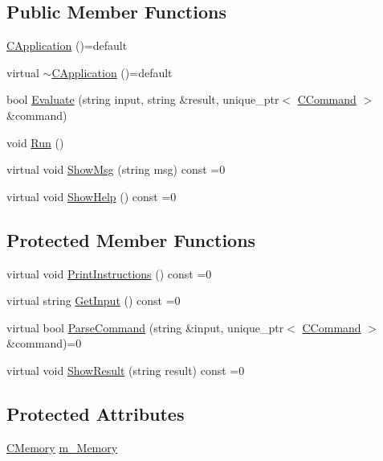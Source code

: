 \subsection*{Public Member Functions}
\begin{DoxyCompactItemize}
\item 
\hyperlink{classCApplication_a186bb7420ce66fadac70d2c30311b6ee}{C\+Application} ()=default
\item 
virtual \hyperlink{classCApplication_ab4448f8a90f380d4ac2afcc9ee59780d}{$\sim$\+C\+Application} ()=default
\item 
bool \hyperlink{classCApplication_ad04074e57722d0954b07ebc82298a02c}{Evaluate} (string input, string \&result, unique\+\_\+ptr$<$ \hyperlink{classCCommand}{C\+Command} $>$ \&command)
\item 
void \hyperlink{classCApplication_aa069063a23e53ea9858995f3ca34d6fb}{Run} ()
\item 
virtual void \hyperlink{classCApplication_ab88b3a17d0d6e5c14eba88fb263c9857}{Show\+Msg} (string msg) const =0
\item 
virtual void \hyperlink{classCApplication_a97b87502b1a3c7fdaa7d8ef2e7870eaf}{Show\+Help} () const =0
\end{DoxyCompactItemize}
\subsection*{Protected Member Functions}
\begin{DoxyCompactItemize}
\item 
virtual void \hyperlink{classCApplication_a308f31081c5a2b880c1bc96dbac3260d}{Print\+Instructions} () const =0
\item 
virtual string \hyperlink{classCApplication_a69a1706c3cf78d8dad7e16734e92b3f6}{Get\+Input} () const =0
\item 
virtual bool \hyperlink{classCApplication_abfa3357f4517c85261fac0bc307e1ab7}{Parse\+Command} (string \&input, unique\+\_\+ptr$<$ \hyperlink{classCCommand}{C\+Command} $>$ \&command)=0
\item 
virtual void \hyperlink{classCApplication_a741354ef7eba83ea594a116069dafddd}{Show\+Result} (string result) const =0
\end{DoxyCompactItemize}
\subsection*{Protected Attributes}
\begin{DoxyCompactItemize}
\item 
\hyperlink{classCMemory}{C\+Memory} \hyperlink{classCApplication_a338eac28666e5f1577716eb7097ffadb}{m\+\_\+\+Memory}
\end{DoxyCompactItemize}


